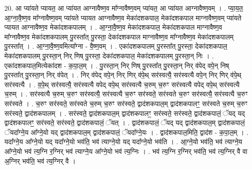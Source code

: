 \documentclass[17pt]{extarticle}
\begin{document}
20. आ प्या॑यते प्यायत॒ आ प्या॑यत आग्नावैष्ण॒व मा᳚ग्नावैष्ण॒वम् प्या॑यत॒ आ प्या॑यत आग्नावैष्ण॒वम् । . प्या॒य॒त॒ आ॒ग्ना॒वै॒ष्ण॒व मा᳚ग्नावैष्ण॒वम् प्या॑यते प्यायत आग्नावैष्ण॒व मेका॑दशकपाल॒ मेका॑दशकपाल माग्नावैष्ण॒वम् प्या॑यते प्यायत आग्नावैष्ण॒व मेका॑दशकपालम् । . आ॒ग्ना॒वै॒ष्ण॒व मेका॑दशकपाल॒ मेका॑दशकपाल माग्नावैष्ण॒व मा᳚ग्नावैष्ण॒व मेका॑दशकपालम् पु॒रस्ता᳚त् पु॒रस्ता॒ देका॑दशकपाल माग्नावैष्ण॒व मा᳚ग्नावैष्ण॒व मेका॑दशकपालम् पु॒रस्ता᳚त् । . आ॒ग्ना॒वै॒ष्ण॒वमित्या᳚ग्ना - वै॒ष्ण॒वम् । . एका॑दशकपालम् पु॒रस्ता᳚त् पु॒रस्ता॒ देका॑दशकपाल॒ मेका॑दशकपालम् पु॒रस्ता॒न् निर् णिष् पु॒रस्ता॒ देका॑दशकपाल॒ मेका॑दशकपालम् पु॒रस्ता॒न् निः । . एका॑दशकपाल॒मित्येका॑दश - क॒पा॒ल॒म् । . पु॒रस्ता॒न् निर् णिष् पु॒रस्ता᳚त् पु॒रस्ता॒न् निर् व॑पेद् वपे॒न् निष् पु॒रस्ता᳚त् पु॒रस्ता॒न् निर् व॑पेत् । . निर् व॑पेद् वपे॒न् निर् णिर् व॑पे॒थ् सर॑स्वत्यै॒ सर॑स्वत्यै वपे॒न् निर् णिर् व॑पे॒थ् सर॑स्वत्यै । . व॒पे॒थ् सर॑स्वत्यै॒ सर॑स्वत्यै वपेद् वपे॒थ् सर॑स्वत्यै च॒रुम् च॒रुꣳ सर॑स्वत्यै वपेद् वपे॒थ् सर॑स्वत्यै च॒रुम् । . सर॑स्वत्यै च॒रुम् च॒रुꣳ सर॑स्वत्यै॒ सर॑स्वत्यै च॒रुꣳ सर॑स्वते॒ सर॑स्वते च॒रुꣳ सर॑स्वत्यै॒ सर॑स्वत्यै च॒रुꣳ सर॑स्वते । . च॒रुꣳ सर॑स्वते॒ सर॑स्वते च॒रुम् च॒रुꣳ सर॑स्वते॒ द्वाद॑शकपाल॒म् द्वाद॑शकपालꣳ॒॒ सर॑स्वते च॒रुम् च॒रुꣳ सर॑स्वते॒ द्वाद॑शकपालम् । . सर॑स्वते॒ द्वाद॑शकपाल॒म् द्वाद॑शकपालꣳ॒॒ सर॑स्वते॒ सर॑स्वते॒ द्वाद॑शकपालं॒ ॅयद् यद् द्वाद॑शकपालꣳ॒॒ सर॑स्वते॒ सर॑स्वते॒ द्वाद॑शकपालं॒ ॅयत् । . द्वाद॑शकपालं॒ ॅयद् यद् द्वाद॑शकपाल॒म् द्वाद॑शकपालं॒ ॅयदा᳚ग्ने॒य आ᳚ग्ने॒यो यद् द्वाद॑शकपाल॒म् द्वाद॑शकपालं॒ ॅयदा᳚ग्ने॒यः । . द्वाद॑शकपाल॒मिति॒ द्वाद॑श - क॒पा॒ल॒म् । . यदा᳚ग्ने॒य आ᳚ग्ने॒यो यद् यदा᳚ग्ने॒यो भव॑ति॒ भव॑ त्याग्ने॒यो यद् यदा᳚ग्ने॒यो भव॑ति । . आ॒ग्ने॒यो भव॑ति॒ भव॑ त्याग्ने॒य आ᳚ग्ने॒यो भव॑ त्य॒ग्नि र॒ग्निर् भव॑ त्याग्ने॒य आ᳚ग्ने॒यो भव॑ त्य॒ग्निः । . भव॑ त्य॒ग्नि र॒ग्निर् भव॑ति॒ भव॑ त्य॒ग्निर् वै वा अ॒ग्निर् भव॑ति॒ भव॑ त्य॒ग्निर् वै । \newline
\end{document}

